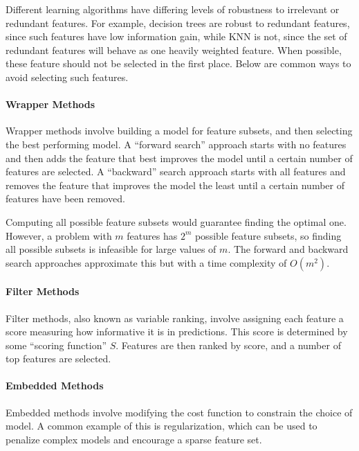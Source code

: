 \documentclass[12pt]{article}
\begin{document}
            Different learning algorithms have differing levels of robustness to irrelevant or redundant features. For example, decision trees are robust
            to redundant features, since such features have low information gain, while KNN is not, since the set of redundant features will behave as one heavily
            weighted feature. When possible, these feature should not be selected in the first place. Below are common ways to avoid selecting such features.

            \paragraph{Wrapper Methods}
            Wrapper methods involve building a model for feature subsets, and then selecting the best performing model. A ``forward search'' approach
            starts with no features and then adds the feature that best improves the model until a certain number of features are selected.  A
            ``backward'' search approach starts with all features and removes the feature that improves the model the least until a certain number
            of features have been removed.

            Computing all possible feature subsets would guarantee finding the optimal one. However, a problem with $m$ features has $2^m$ possible
            feature subsets, so finding all possible subsets is infeasible for large values of $m$. The forward and backward search approaches
            approximate this but with a time complexity of $O(m^2)$.

            \paragraph{Filter Methods}
            Filter methods, also known as variable ranking, involve assigning each feature a score measuring how informative it is in predictions. This
            score is determined by some ``scoring function'' $S$. Features are then ranked by score, and a number of top features are selected.

            \paragraph{Embedded Methods}
            Embedded methods involve  modifying the cost function to constrain the choice of model. A common example of this is regularization, which can
            be used to penalize complex models and encourage a sparse feature set.
\end{document}
